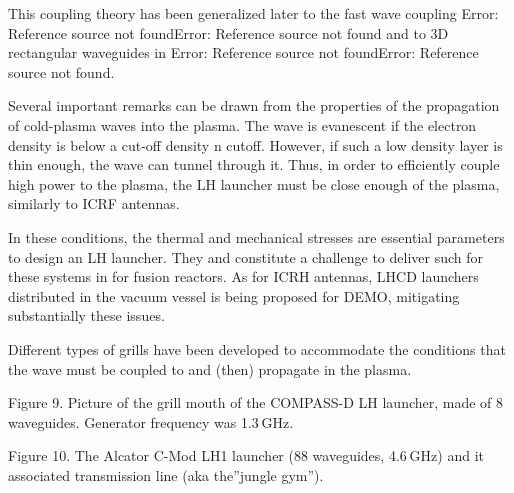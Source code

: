This coupling theory has been generalized later to the fast wave coupling Error: Reference source not foundError: Reference source not found and to 3D rectangular waveguides in Error: Reference source not foundError: Reference source not found. 

Several important remarks can be drawn from the properties of the propagation of cold-plasma waves into the plasma. The wave is evanescent if the electron density is below a cut-off density n cutoff. However, if such a low density layer is thin enough, the wave can tunnel through it. Thus, in order to efficiently couple high power to the plasma, the LH launcher must be close enough of the plasma, similarly to ICRF antennas. 

In these conditions, the thermal and mechanical stresses are essential parameters to design an LH launcher. They and constitute a challenge to deliver such for these systems in for fusion reactors. As for ICRH antennas, LHCD launchers distributed in the vacuum vessel is being proposed for DEMO, mitigating substantially these issues.

Different types of grills have been developed to accommodate the conditions that the wave must be coupled to and (then) propagate in the plasma. 


Figure 9. Picture of the grill mouth of the COMPASS-D LH launcher, made of 8 waveguides. Generator frequency was 1.3 GHz.


Figure 10. The Alcator C-Mod LH1 launcher (88 waveguides, 4.6 GHz) and it associated transmission line (aka the”jungle gym”). 

